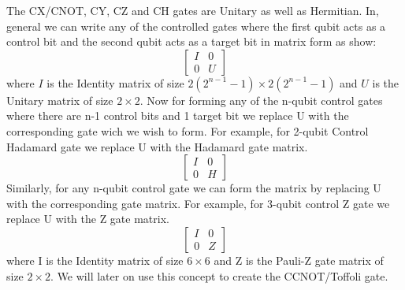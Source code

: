 \documentclass[12pt, oneside]{book}
\theoremstyle{definition}
\theoremstyle{definition}
\theoremstyle{remark}
\begin{document}
\begin{importantnote}
    The CX/CNOT, CY, CZ and CH gates are Unitary as well as Hermitian. In, general we can write any of the controlled gates where the first qubit acts as a control bit
    and the second qubit acts as a target bit in matrix form as show:
    \[
        \begin{bmatrix}
            I & 0 \\
            0 & U
        \end{bmatrix}
    \]
    where $I$ is the Identity matrix of size $2(2^{n-1}-1)\times 2(2^{n-1}-1)$ and $U$ is the Unitary matrix of size $2\times 2$. Now for forming any of the n-qubit control gates where 
    there are n-1 control bits and 1 target bit we replace U with the corresponding gate wich we wish to form. 
    For example, for 2-qubit Control Hadamard gate we replace U with the Hadamard gate matrix.
    \[
        \begin{bmatrix}
            I & 0 \\
            0 & H
        \end{bmatrix}
    \]
    Similarly, for any n-qubit control gate we can form the matrix by replacing U with the corresponding gate matrix.
    For example, for 3-qubit control Z gate we replace U with the Z gate matrix.
    \[
        \begin{bmatrix}
            I & 0 \\
            0 & Z
        \end{bmatrix}
    \]
    where I is the Identity matrix of size $6\times 6$ and Z is the Pauli-Z gate matrix of size $2 \times 2$.
    We will later on use this concept to create the CCNOT/Toffoli gate.
\end{importantnote}
\end{document}
